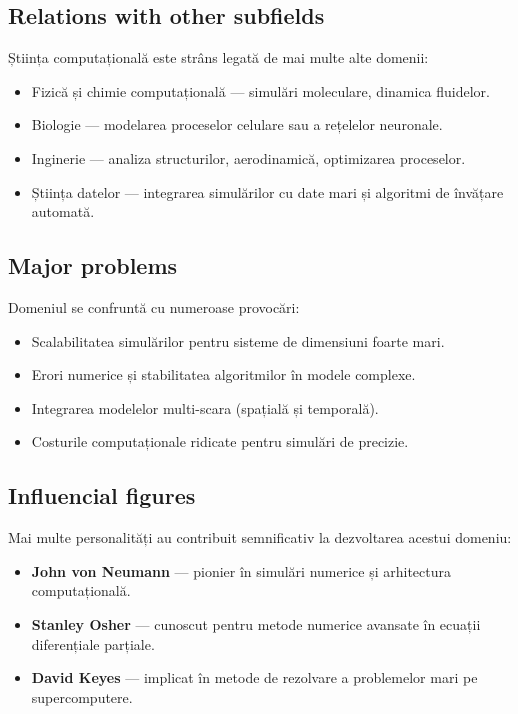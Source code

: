 \documentclass[12pt, letterpaper]{article}
\begin{document}
\subsection*{Relations with other subfields}
Știința computațională este strâns legată de mai multe alte domenii:
\begin{itemize}
    \item Fizică și chimie computațională — simulări moleculare, dinamica fluidelor.
    \item Biologie — modelarea proceselor celulare sau a rețelelor neuronale.
    \item Inginerie — analiza structurilor, aerodinamică, optimizarea proceselor.
    \item Știința datelor — integrarea simulărilor cu date mari și algoritmi de învățare automată.
\end{itemize}

\subsection*{Major problems}
Domeniul se confruntă cu numeroase provocări:
\begin{itemize}
    \item Scalabilitatea simulărilor pentru sisteme de dimensiuni foarte mari.
    \item Erori numerice și stabilitatea algoritmilor în modele complexe.
    \item Integrarea modelelor multi-scara (spațială și temporală).
    \item Costurile computaționale ridicate pentru simulări de precizie.
\end{itemize}

\subsection*{Influencial figures}
Mai multe personalități au contribuit semnificativ la dezvoltarea acestui domeniu:
\begin{itemize}
    \item \textbf{John von Neumann} — pionier în simulări numerice și arhitectura computațională.
    \item \textbf{Stanley Osher} — cunoscut pentru metode numerice avansate în ecuații diferențiale parțiale.
    \item \textbf{David Keyes} — implicat în metode de rezolvare a problemelor mari pe supercomputere.
\end{itemize}
\end{document}
